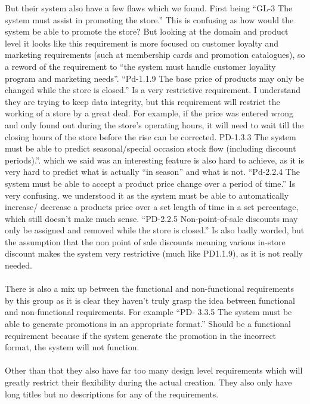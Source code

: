 \documentclass[a4paper]{article}
\begin{document}
But their system also have a few flaws which we found. First being “GL-3 The system must assist in promoting the store.” This is confusing as how would the system be able to promote the store? But looking at the domain and product level it looks like this requirement is more focused on customer loyalty and marketing requirements (such at membership cards and promotion catalogues), so a reword of the requirement to “the system must handle customer loyality program and marketing needs”. “Pd-1.1.9 The base price of products may only be changed while the store is closed.” Is a very restrictive requirement. I understand they are trying to keep data integrity, but this requirement will restrict the working of a store by a great deal. For example, if the price was entered wrong and only found out during the store’s operating hours, it will need to wait till the closing hours of the store before the rise can be corrected. PD-1.3.3 The system must be able to predict seasonal/special occasion stock flow (including discount periods).”. which we said was an interesting feature is also hard to achieve, as it is very hard to predict what is actually “in season” and what is not.  “Pd-2.2.4 The system must be able to accept a product price change over a period of time.” Is very confusing. we understood it as the system must be able to automatically increase/ decrease a products price over a set length of time in a set percentage, which still doesn’t make much sense. “PD-2.2.5 Non-point-of-sale discounts may only be assigned and removed while the store is closed.” Is also badly worded, but the assumption that the non point of sale discounts meaning various in-store discount makes the system very restrictive (much like PD1.1.9), as it is not really needed.
 \\\\
There is also a mix up between the functional and non-functional requirements by this group as it is clear they haven’t truly grasp the idea between functional and non-functional requirements. For example “PD- 3.3.5 The system must be able to generate promotions in an appropriate format.” Should be a functional requirement because if the system generate the promotion in the incorrect format, the system will not function.
\\\\
Other than that they also have far too many design level requirements which will greatly restrict their flexibility during the actual creation. They also only have long titles but no descriptions for any of the requirements. 
\\\\
\end{document}
